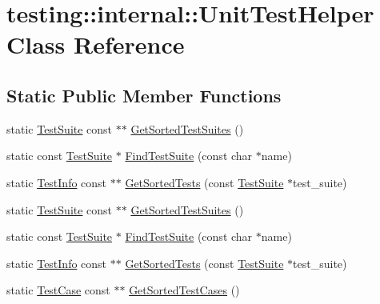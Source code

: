 \hypertarget{classtesting_1_1internal_1_1_unit_test_helper}{}\section{testing\+::internal\+::Unit\+Test\+Helper Class Reference}
\label{classtesting_1_1internal_1_1_unit_test_helper}
\subsection*{Static Public Member Functions}
\begin{DoxyCompactItemize}
\item 
static \mbox{\hyperlink{classtesting_1_1_test_suite}{Test\+Suite}} const  $\ast$$\ast$ \mbox{\hyperlink{classtesting_1_1internal_1_1_unit_test_helper_a5704cd10fdef526c4c541fc53a24ed41}{Get\+Sorted\+Test\+Suites}} ()
\item 
static const \mbox{\hyperlink{classtesting_1_1_test_suite}{Test\+Suite}} $\ast$ \mbox{\hyperlink{classtesting_1_1internal_1_1_unit_test_helper_a1e95da834922a2ebcf33a7ee73f17757}{Find\+Test\+Suite}} (const char $\ast$name)
\item 
static \mbox{\hyperlink{classtesting_1_1_test_info}{Test\+Info}} const  $\ast$$\ast$ \mbox{\hyperlink{classtesting_1_1internal_1_1_unit_test_helper_a54bff33b585ae04423ddd959ebfc0b90}{Get\+Sorted\+Tests}} (const \mbox{\hyperlink{classtesting_1_1_test_suite}{Test\+Suite}} $\ast$test\+\_\+suite)
\item 
static \mbox{\hyperlink{classtesting_1_1_test_suite}{Test\+Suite}} const  $\ast$$\ast$ \mbox{\hyperlink{classtesting_1_1internal_1_1_unit_test_helper_a5704cd10fdef526c4c541fc53a24ed41}{Get\+Sorted\+Test\+Suites}} ()
\item 
static const \mbox{\hyperlink{classtesting_1_1_test_suite}{Test\+Suite}} $\ast$ \mbox{\hyperlink{classtesting_1_1internal_1_1_unit_test_helper_a1e95da834922a2ebcf33a7ee73f17757}{Find\+Test\+Suite}} (const char $\ast$name)
\item 
static \mbox{\hyperlink{classtesting_1_1_test_info}{Test\+Info}} const  $\ast$$\ast$ \mbox{\hyperlink{classtesting_1_1internal_1_1_unit_test_helper_a54bff33b585ae04423ddd959ebfc0b90}{Get\+Sorted\+Tests}} (const \mbox{\hyperlink{classtesting_1_1_test_suite}{Test\+Suite}} $\ast$test\+\_\+suite)
\item 
static \mbox{\hyperlink{classtesting_1_1_test_case}{Test\+Case}} const  $\ast$$\ast$ \mbox{\hyperlink{classtesting_1_1internal_1_1_unit_test_helper_a9a549307062083d10358638af272cc98}{Get\+Sorted\+Test\+Cases}} ()
$$
\end{DoxyCompactItemize}
